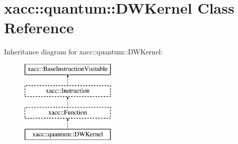 \hypertarget{a00983}{}\section{xacc\+:\+:quantum\+:\+:D\+W\+Kernel Class Reference}
\label{a00983}
Inheritance diagram for xacc\+:\+:quantum\+:\+:D\+W\+Kernel\+:\begin{figure}[H]
\begin{center}
\leavevmode
\includegraphics[height=4.000000cm]{a00983}
\end{center}
\end{figure}
